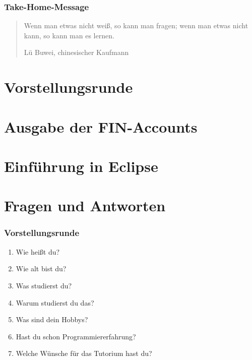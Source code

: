 \documentclass[12pt]{beamer}
\begin{document}
\begin{frame}
	\frametitle{Take-Home-Message}
	\begin{quote}
		Wenn man etwas nicht weiß, so kann man fragen; wenn man etwas nicht
		kann, so kann man es lernen.
		\newline
		\begin{flushright}
		\scriptsize Lü Buwei, chinesischer Kaufmann
		\end{flushright}
	\end{quote}

\end{frame}

\section{Vorstellungsrunde}
\section{Ausgabe der FIN-Accounts}
\section{Einführung in Eclipse}
\section{Fragen und Antworten}

\begin{frame}
	\frametitle{Vorstellungsrunde}
	\begin{enumerate}
		\item Wie heißt du?
		\item Wie alt bist du?
		\item Was studierst du?
		\item Warum studierst du das?
		\item Was sind dein Hobbys?
		\item Hast du schon Programmiererfahrung?
		\item Welche Wünsche für das Tutorium hast du?
	\end{enumerate}
\end{frame}
\end{document}
